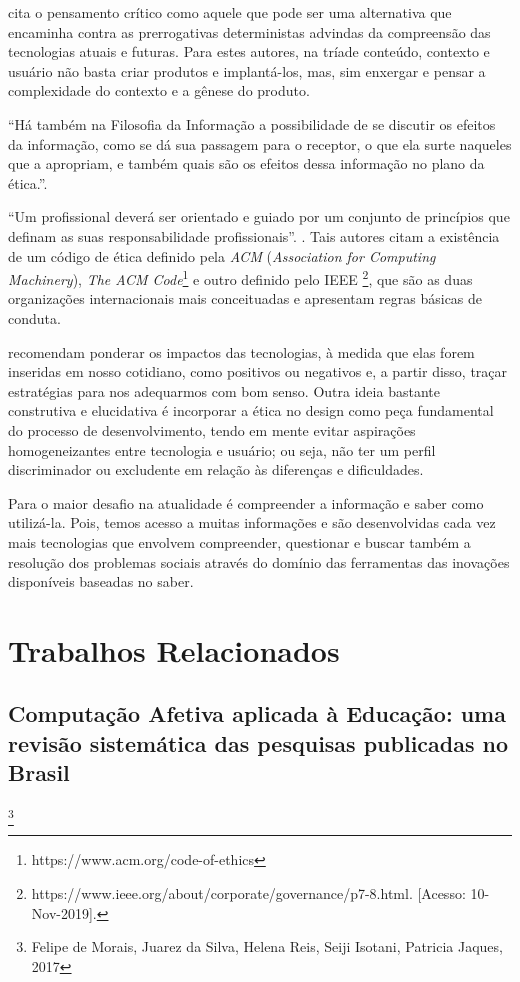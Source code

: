 \documentclass[
	12pt,				    %
	openright,			    %
	oneside,			    %
	a4paper,			    %
    sumario=tradicional,    %
	english,			    %
	brazil,				    %
	]{abntex2}              %
\begin{document}
 cita o pensamento crítico como aquele que pode ser uma alternativa que encaminha contra as prerrogativas deterministas advindas da compreensão das tecnologias atuais e futuras. Para estes autores, na tríade conteúdo, contexto e usuário não basta criar produtos e implantá-los, mas, sim enxergar e pensar a complexidade do contexto e a gênese do produto.

``Há também na Filosofia da Informação a possibilidade de se discutir os efeitos da informação, como se dá sua passagem para o receptor, o que ela surte naqueles que a apropriam, e também quais são os efeitos dessa informação no plano da ética.''\cite{bembem2014tempo}.

``Um profissional deverá ser orientado e guiado por um conjunto de princípios que definam as suas responsabilidade profissionais''. \cite{piteira2019etica}. Tais autores citam a existência de um código de ética definido pela \textit{ACM} (\textit{Association for Computing Machinery}), \textit{The ACM Code}\footnote{https://www.acm.org/code-of-ethics} e outro definido pelo IEEE \footnote{https://www.ieee.org/about/corporate/governance/p7-8.html. [Acesso: 10-Nov-2019].}, que são as duas organizações internacionais mais conceituadas e apresentam regras básicas de conduta.

 recomendam ponderar os impactos das tecnologias, à medida que elas forem inseridas em nosso cotidiano, como positivos ou negativos e, a partir disso, traçar estratégias para nos adequarmos com bom senso. Outra ideia bastante construtiva e elucidativa é incorporar a ética no design como peça fundamental do processo de desenvolvimento, tendo em mente evitar aspirações homogeneizantes entre tecnologia e usuário; ou seja, não ter um perfil discriminador ou excludente em relação às diferenças e dificuldades.

Para  o	maior	desafio	na	atualidade é compreender a	informação	e	saber	como	utilizá-la.	Pois, temos acesso a muitas informações e são desenvolvidas cada vez mais tecnologias	que	envolvem compreender, questionar e buscar também	a	resolução	dos	problemas	sociais	através do	domínio	das ferramentas das	inovações disponíveis baseadas no saber.	
 
\chapter{Trabalhos Relacionados}\label{sec:TrabRel}

\section{Computação Afetiva aplicada à Educação: uma revisão sistemática das pesquisas publicadas no Brasil} \footnote{Felipe de Morais, Juarez da Silva, Helena Reis, Seiji Isotani, Patricia Jaques, 2017}
\end{document}

